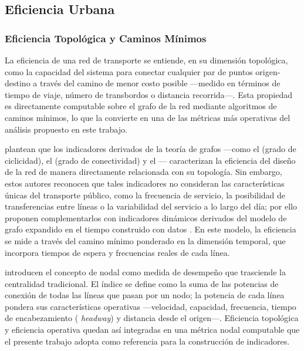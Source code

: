 
\subsection{Eficiencia Urbana}
\label{subsec:eficiencia-urbana}

\subsubsection{Eficiencia Topológica y Caminos Mínimos}
\label{subsubsec:eficiencia-topologica}

La eficiencia de una red de transporte se entiende, en su dimensión topológica,
como la capacidad del sistema para conectar cualquier par de puntos
origen-destino a través del camino de menor costo posible ---medido en términos
de tiempo de viaje, número de transbordos o distancia recorrida---. Esta
propiedad es directamente computable sobre el grafo de la red mediante
algoritmos de caminos mínimos, lo que la convierte en una de las métricas más
operativas del análisis propuesto en este trabajo.

\citet{fortin2016innovative} plantean que los indicadores derivados de la teoría
de grafos ---como el  (grado de ciclicidad), el
 (grado de conectividad) y el
--- caracterizan la eficiencia del
diseño de la red de manera directamente relacionada con su topología. Sin
embargo, estos autores reconocen que tales indicadores no consideran las
características únicas del transporte público, como la frecuencia de servicio,
la posibilidad de transferencias entre líneas o la variabilidad del servicio a
lo largo del día; por ello proponen complementarlos con indicadores dinámicos
derivados del modelo de grafo expandido en el tiempo construido con datos
\gtfs{}. En este modelo, la eficiencia se mide a través del camino mínimo
ponderado en la dimensión temporal, que incorpora tiempos de espera y
frecuencias reales de cada línea.

\citet{mishra2015} introducen el concepto de 
nodal como medida de desempeño que trasciende la centralidad tradicional. El
índice se define como la suma de las potencias de conexión de todas las líneas
que pasan por un nodo; la potencia de cada línea pondera sus características
operativas ---velocidad, capacidad, frecuencia, tiempo de encabezamiento (
\textit{headway}) y distancia desde el origen---. Eficiencia topológica y
eficiencia operativa quedan así integradas en una métrica nodal computable que
el presente trabajo adopta como referencia para la construcción de indicadores.

